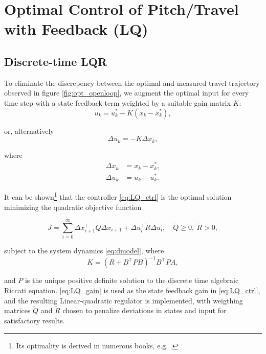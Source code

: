 \section{Optimal Control of Pitch/Travel with Feedback (LQ)}\label{sec:prob3}
\label{text:problem3}

\subsection{Discrete-time LQR}
\label{text:LQR}

To eliminate the discrepency between the optimal and measured travel trajectory observed in figure \ref{fig:opt_openloop}, we augment the optimal input for every time step with a state feedback term weighted by a suitable gain matrix $K$:
\begin{equation*}
u_k = u_k^* - K (x_k - x_k^*),
\end{equation*}

or, alternatively
\begin{equation}
\label{eq:LQ_ctrl}
\Delta u_k = - K \Delta x_k,
\end{equation}

where 
\begin{align*}
\Delta x_k &= x_k - x_k^*,\\
\Delta u_k &= u_k - u_k^*.
\end{align*}

It can be shown\footnote{Its optimality is derived in numerous books, e.g. \cite{Kwakernaak1972}.} that the controller \eqref{eq:LQ_ctrl} is the optimal solution minimizing the quadratic objective function

\begin{equation*}
	J = \sum_{i=0}^{\infty} \Delta x_{i+1}^\top \tilde{Q} \Delta x_{i+1} + \Delta u_i^\top \tilde{R} \Delta u_i, \quad \tilde{Q} \ge 0,\ \tilde{R} > 0,
\end{equation*}

subject to the system dynamics \eqref{eq:dmodel}, where
\begin{equation}
\label{eq:LQ_gain}
	K = (R + B^\top P B)^{-1} B^\top P A,
\end{equation}

and $P$ is the unique positive definite solution to the discrete time algebraic Riccati equation. \eqref{eq:LQ_gain} is used as the state feedback gain in \eqref{eq:LQ_ctrl}, and the resulting Linear-quadratic regulator is implemented, with weigthing matrices $\tilde{Q}$ and $\tilde{R}$ chosen to penalize deviations in states and input for satisfactory results.

